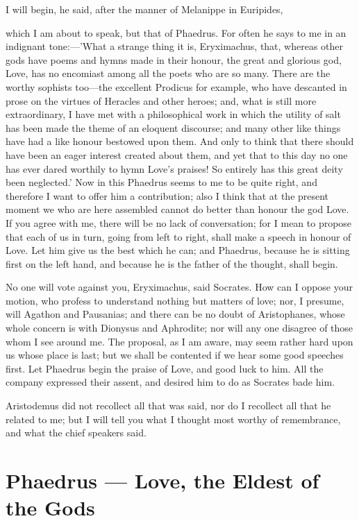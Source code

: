 \para[44] I will begin, he said, after the manner of Melanippe in Euripides,

\para[45] which I am about to speak, but that of Phaedrus. For often he says to me in an indignant tone:---'What a strange thing it is, Eryximachus, that, whereas other gods have poems and hymns made in their honour, the great and glorious god, Love, has no encomiast among all the poets who are so many. There are the worthy sophists too---the excellent Prodicus for example, who have descanted in prose on the virtues of Heracles and other heroes; and, what is still more extraordinary, I have met with a philosophical work in which the utility of salt has been made the theme of an eloquent discourse; and many other like things have had a like honour bestowed upon them. And only to think that there should have been an eager interest created about them, and yet that to this day no one has ever dared worthily to hymn Love's praises! So entirely has this great deity been neglected.' Now in this Phaedrus seems to me to be quite right, and therefore I want to offer him a contribution; also I think that at the present moment we who are here assembled cannot do better than honour the god Love. If you agree with me, there will be no lack of conversation; for I mean to propose that each of us in turn, going from left to right, shall make a speech in honour of Love. Let him give us the best which he can; and Phaedrus, because he is sitting first on the left hand, and because he is the father of the thought, shall begin.

\para[46] No one will vote against you, Eryximachus, said Socrates. How can I oppose your motion, who profess to understand nothing but matters of love; nor, I presume, will Agathon and Pausanias; and there can be no doubt of Aristophanes, whose whole concern is with Dionysus and Aphrodite; nor will any one disagree of those whom I see around me. The proposal, as I am aware, may seem rather hard upon us whose place is last; but we shall be contented if we hear some good speeches first. Let Phaedrus begin the praise of Love, and good luck to him. All the company expressed their assent, and desired him to do as Socrates bade him.

\para[47] Aristodemus did not recollect all that was said, nor do I recollect all that he related to me; but I will tell you what I thought most worthy of remembrance, and what the chief speakers said.

\section*{Phaedrus — Love, the Eldest of the Gods}

